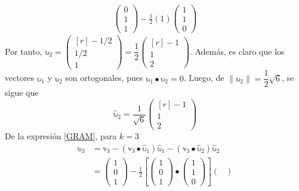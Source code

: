 \begin{example}
\begin{align*}
\begin{pmatrix}
            0 \\
            1 \\
            1
        \end{pmatrix} - \frac{1}{2}(1) \begin{pmatrix}
            1 \\
            1 \\
            0
        \end{pmatrix}
    \end{align*}
    Por tanto, $\mathbb{u}_2 = \begin{pmatrix*}[r]
        -1/2 \\
        1/2 \\
        1
    \end{pmatrix*} = \dfrac{1}{2} \begin{pmatrix*}[r]
        -1 \\
        1 \\
        2
    \end{pmatrix*}$. Además, es claro que los vectores $\mathbb{u}_1$ y $\mathbb{u}_2$ son ortogonales, pues $\mathbb{u}_1 \bullet \mathbb{u}_2 = 0$. Luego, de $\| \mathbb{u}_2 \| = \dfrac{1}{2} \sqrt{6}$, se sigue que
    $$\hat{\mathbb{u}}_2 = \frac{1}{\sqrt{6}} \begin{pmatrix*}[r]
        -1 \\
        1 \\
        2
    \end{pmatrix*}$$
    De la expresión \eqref{GRAM}, para $k = 3$
    \begin{align*}
        \mathbb{u}_3 & = \mathbb{v}_3 - (\mathbb{v}_3 \bullet \hat{\mathbb{u}}_1)\hat{\mathbb{u}}_1 - (\mathbb{v}_3 \bullet \hat{\mathbb{u}}_2)\hat{\mathbb{u}}_2 \\
        & = \begin{pmatrix}
            1 \\
            0 \\
            1
        \end{pmatrix} - \frac{1}{2} \left[ \begin{pmatrix}
            1 \\
            0 \\
            1
        \end{pmatrix} \bullet \begin{pmatrix}
            1 \\
            1 \\
            0
        \end{pmatrix} \right] \begin{pmatrix}

\end{pmatrix}
\end{align*}
\end{example}
